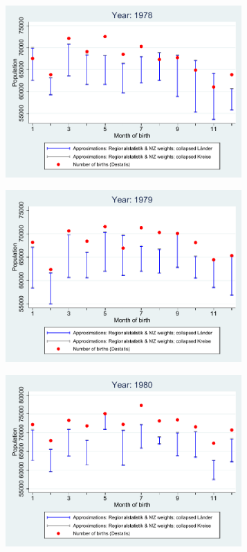 \documentclass[a4paper ]{article}
\begin{document}
\begin{figure}[h]
\begin{subfigure}[t]{0.48\textwidth}
		\includegraphics[width=0.99\textwidth]{comparison_population_1978.pdf}		
\end{subfigure}
\begin{subfigure}[t]{0.48\textwidth}
		\centering
		\includegraphics[width=0.99\textwidth]{comparison_population_1979.pdf}		
\end{subfigure}
\begin{subfigure}[t]{0.48\textwidth}
		\centering
		\includegraphics[width=0.99\textwidth]{comparison_population_1980.pdf}		
\end{subfigure}
\end{figure}
\end{document}
